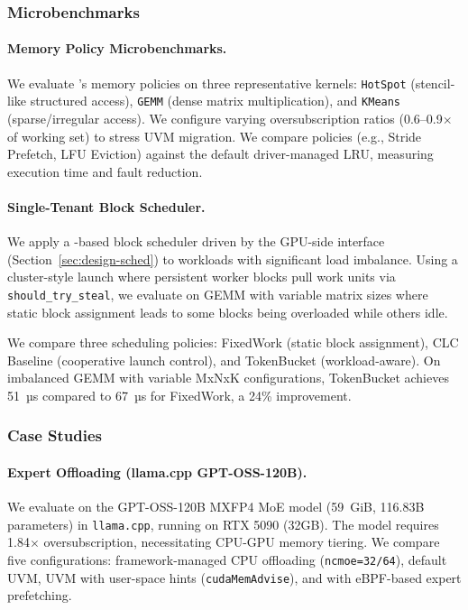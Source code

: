 \subsubsection{Microbenchmarks}

\paragraph{Memory Policy Microbenchmarks.}
We evaluate \sys's memory policies on three representative kernels: \texttt{HotSpot} (stencil-like structured access), \texttt{GEMM} (dense matrix multiplication), and \texttt{KMeans} (sparse/irregular access). We configure varying oversubscription ratios (0.6--0.9$\times$ of working set) to stress UVM migration. We compare \sys policies (e.g., Stride Prefetch, LFU Eviction) against the default driver-managed LRU, measuring execution time and fault reduction.

\paragraph{Single-Tenant Block Scheduler.}
We apply a \sys-based block scheduler driven by the GPU-side interface
(Section~\ref{sec:design-sched}) to workloads with significant load imbalance.
Using a cluster-style launch where persistent worker blocks pull work units
via \texttt{should\_try\_steal}, we evaluate on GEMM with variable matrix sizes where static block assignment leads to some blocks being overloaded while others idle.

We compare three scheduling policies: FixedWork (static block assignment), CLC Baseline (cooperative launch control), and TokenBucket (workload-aware). On imbalanced GEMM with variable MxNxK configurations, TokenBucket achieves 51~µs compared to 67~µs for FixedWork, a 24\% improvement.

\subsubsection{Case Studies}

\paragraph{Expert Offloading (llama.cpp GPT-OSS-120B).}
We evaluate \sys on the GPT-OSS-120B MXFP4 MoE model (59~GiB, 116.83B parameters) in \texttt{llama.cpp}, running on RTX 5090 (32GB). The model requires 1.84$\times$ oversubscription, necessitating CPU-GPU memory tiering. We compare five configurations: framework-managed CPU offloading (\texttt{ncmoe=32/64}), default UVM, UVM with user-space hints (\texttt{cudaMemAdvise}), and \sys with eBPF-based expert prefetching.

